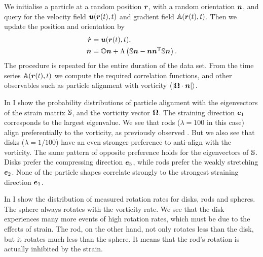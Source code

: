 \documentclass[thesis.tex]{subfiles}
\begin{document}
We initialise a particle at a random position $\mbox{\boldmath$r$}$, with a random orientation $\mbox{\boldmath$n$}$, and query for the velocity field $\mbox{\boldmath$u$}(\mbox{\boldmath$r$}(t), t)$ and gradient field $\mathbb{A}(\mbox{\boldmath$r$}(t), t)$. Then we update the position and orientation by
\begin{align*}
	\dot {\mbox{\boldmath$r$}} &= \mbox{\boldmath$u$}(\mbox{\boldmath$r$}(t), t), \\
	\dot {\mbox{\boldmath$n$}} &= \mathbb{O} \mbox{\boldmath$n$} + \Lambda\left(\mathbb{S} \mbox{\boldmath$n$} - \mbox{\boldmath$n$} \mbox{\boldmath$n$}^{\mathrm T} \mathbb{S} \mbox{\boldmath$n$}\right).
\end{align*}
The procedure is repeated for the entire duration of the data set. From the time series $\mathbb{A}(\mbox{\boldmath$r$}(t), t)$ we compute the required correlation functions, and other observables such as particle alignment with vorticity $\langle|\mbox{\boldmath$\Omega$} \cdot \mbox{\boldmath$n$}|\rangle$.


In  I show the probability distributions of particle alignment with the eigenvectors of the strain matrix $\mathbb{S}$, and the vorticity vector $\mbox{\boldmath$\Omega$}$. The straining direction $\mbox{\boldmath$e$}_1$ corresponds to the largest eigenvalue. We see that rods ($\lambda=100$ in this case) align preferentially to the vorticity, as previously observed \cite{pumir2011}. But we also see that disks ($\lambda=1/100$) have an even stronger preference to anti-align with the vorticity. The same pattern of opposite preference holds for the eigenvectors of $\mathbb{S}$. Disks prefer the compressing direction $\mbox{\boldmath$e$}_3$, while rods prefer the weakly stretching $\mbox{\boldmath$e$}_2$. None of the particle shapes correlate strongly to the strongest straining direction $\mbox{\boldmath$e$}_1$.

In  I show the distribution of measured rotation rates for disks, rods and spheres. 
The sphere always rotates with the vorticity rate. We see that the disk experiences many more events of high rotation rates, which must be due to the effects of strain. The rod, on the other hand, not only rotates less than the disk, but it rotates much less than the sphere. It means that the rod's rotation is actually inhibited by the strain.
\end{document}
